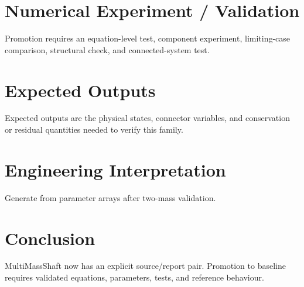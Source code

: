 \documentclass[10pt,a4paper]{article}
\begin{document}
\section{Numerical Experiment / Validation}Promotion requires an equation-level test, component experiment, limiting-case comparison, structural check, and connected-system test.
\section{Expected Outputs}Expected outputs are the physical states, connector variables, and conservation or residual quantities needed to verify this family.
\section{Engineering Interpretation}Generate from parameter arrays after two-mass validation.
\section*{Conclusion}MultiMassShaft now has an explicit source/report pair. Promotion to baseline requires validated equations, parameters, tests, and reference behaviour.
\end{document}
